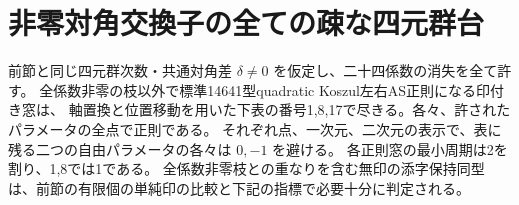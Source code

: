 \section{非零対角交換子の全ての疎な四元群台}
\label{sec:marked-klein-mixed-supports}
\begin{theorem}\label{thm:marked-klein-mixed-supports}
前節と同じ四元群次数・共通対角差 $\delta\ne0$ を仮定し、二十四係数の消失を全て許す。
全係数非零の枝以外で標準14641型quadratic Koszul左右AS正則になる印付き窓は、
軸置換と位置移動を用いた下表の番号1,8,17で尽きる。各々、許されたパラメータの全点で正則である。
それぞれ点、一次元、二次元の表示で、表に残る二つの自由パラメータの各々は $0,-1$ を避ける。
各正則窓の最小周期は2を割り、1,8では1である。
全係数非零枝との重なりを含む無印の添字保持同型は、前節の有限個の単純印の比較と下記の指標で必要十分に判定される。
\end{theorem}
